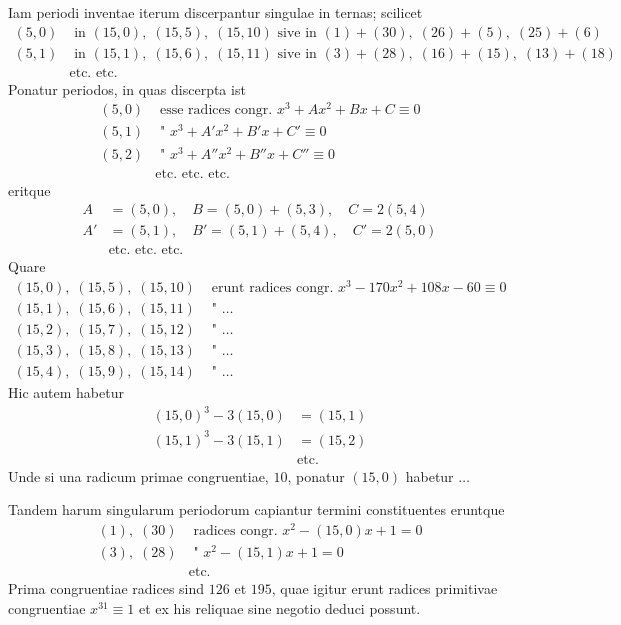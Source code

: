 \documentclass[12pt,a4paper]{article}
\begin{document}
Iam periodi inventae iterum discerpantur singulae in ternas; scilicet
\[
\begin{aligned}
(5,0) &\text{ in } (15,0),\; (15,5),\; (15,10) \text{ sive in } (1)+(30),\; (26)+(5),\; (25)+(6)\\
(5,1) &\text{ in } (15,1),\; (15,6),\; (15,11) \text{ sive in } (3)+(28),\; (16)+(15),\; (13)+(18)\\
& \text{etc. etc.}
\end{aligned}
\]
Ponatur periodos, in quas discerpta ist
\[
\begin{aligned}
(5,0) &\text{ esse radices congr.\ } x^3 + Ax^2 + Bx + C \equiv 0\\
(5,1) &\text{ "\ } x^3 + A'x^2 + B'x + C' \equiv 0\\
(5,2) &\text{ "\ } x^3 + A''x^2 + B''x + C'' \equiv 0\\
& \text{etc. etc. etc.}
\end{aligned}
\]
eritque
\[
\begin{aligned}
A &= (5,0),\quad B = (5,0)+(5,3),\quad C = 2(5,4)\\
A' &= (5,1),\quad B' = (5,1)+(5,4),\quad C' = 2(5,0)\\
& \text{etc. etc. etc.}
\end{aligned}
\]
Quare
\[
\begin{aligned}
(15,0),\; (15,5),\; (15,10) &\text{ erunt radices congr.\ } x^3 - 170x^2 + 108x - 60 \equiv 0\\
(15,1),\; (15,6),\; (15,11) &\text{ "\ } \ldots\\
(15,2),\; (15,7),\; (15,12) &\text{ "\ } \ldots\\
(15,3),\; (15,8),\; (15,13) &\text{ "\ } \ldots\\
(15,4),\; (15,9),\; (15,14) &\text{ "\ } \ldots
\end{aligned}
\]
Hic autem habetur
\[
\begin{aligned}
(15,0)^3 - 3(15,0) &= (15,1)\\
(15,1)^3 - 3(15,1) &= (15,2)\\
& \text{etc.}
\end{aligned}
\]
Unde si una radicum primae congruentiae, $10$, ponatur $(15,0)$ habetur $\ldots$

Tandem harum singularum periodorum capiantur termini constituentes eruntque
\[
\begin{aligned}
(1),\; (30) &\text{ radices congr.\ } x^2 - (15,0)x + 1 = 0\\
(3),\; (28) &\text{ "\ } x^2 - (15,1)x + 1 = 0\\
& \text{etc.}
\end{aligned}
\]
Prima congruentiae radices sind $126$ et $195$, quae igitur erunt radices primitivae congruentiae $x^{31}\equiv 1$ et ex his reliquae sine negotio deduci possunt.
\end{document}
